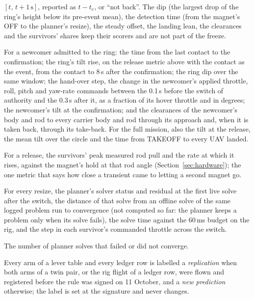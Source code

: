 \begin{description}
    $[t,\,t+1\,\mathrm{s}]$, reported as $t-t_e$, or ``not back''. The dip (the largest drop of the ring's
    height below its pre-event mean), the detection time (from the magnet's OFF to the planner's resize), the
    steady offset, the landing lean, the clearances and the survivors' shares keep their scorers and are not
    part of the freeze.
    \item[Join metrics] For a newcomer admitted to the ring: the time from the last contact to the confirmation; the ring's
    tilt rise, on the release metric above with the contact as the event, from the contact to 8\,s after the
    confirmation; the ring dip over the same window; the hand-over step, the change in the newcomer's applied
    throttle, roll, pitch and yaw-rate commands between the 0.1\,s before the switch of authority and the 0.3\,s
    after it, as a fraction of its hover throttle and in degrees; the newcomer's tilt at the confirmation; and the
    clearances of the newcomer's body and rod to every carrier body and rod through its approach and, when it is
    taken back, through its take-back. For the full mission, also the tilt at the release, the mean tilt over the
    circle and the time from TAKEOFF to every UAV landed.
    \item[Magnet margin] For a release, the survivors' peak measured rod pull and the rate at which it rises,
    against the magnet's hold at that rod angle (Section~\ref{sec:hardware}); the one metric that says how close a
    transient came to letting a second magnet go.
    \item[Switch validation] For every resize, the planner's solver status and residual at the first live solve
    after the switch, the distance of that solve from an offline solve of the same logged problem run to
    convergence (not computed so far: the planner keeps a problem only when its solve fails), the solve time against the 60\,ms budget on the rig, and the step in each survivor's commanded
    throttle across the switch.
    \item[Solver health] The number of planner solves that failed or did not converge.
\end{description}

Every arm of a lever table and every ledger row is labelled a \emph{replication} when both arms of a twin pair, or the
rig flight of a ledger row, were flown and registered before the rule was signed on 11 October, and a \emph{new
prediction} otherwise; the label is set at the signature and never changes.

